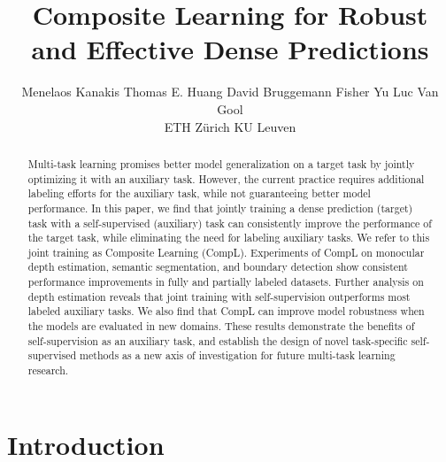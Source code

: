 \documentclass[10pt,twocolumn,letterpaper]{article}
\begin{document}
\title{Composite Learning for Robust and Effective Dense Predictions}

\author{Menelaos Kanakis\quad
    Thomas E. Huang\quad
    David Bruggemann\quad
    Fisher Yu\quad
	Luc Van Gool \vspace{2mm} \\
ETH Z\"urich \quad KU Leuven
}

\maketitle
\thispagestyle{empty}

\begin{abstract}
Multi-task learning promises better model generalization on a target task by jointly optimizing it with an auxiliary task. 
However, the current practice requires additional labeling efforts for the auxiliary task, while not guaranteeing better model performance.
In this paper, we find that jointly training a dense prediction (target) task with a self-supervised (auxiliary) task can consistently improve the performance of the target task, while eliminating the need for labeling auxiliary tasks. 
We refer to this joint training as Composite Learning (CompL). 
Experiments of CompL on monocular depth estimation, semantic segmentation, and boundary detection show consistent performance improvements in fully and partially labeled datasets. 
Further analysis on depth estimation reveals that joint training with self-supervision outperforms most labeled auxiliary tasks. 
We also find that CompL can improve model robustness when the models are evaluated in new domains.
These results demonstrate the benefits of self-supervision as an auxiliary task, and establish the design of novel task-specific self-supervised methods as a new axis of investigation for future multi-task learning research.
\end{abstract}
 \section{Introduction}
\end{document}
